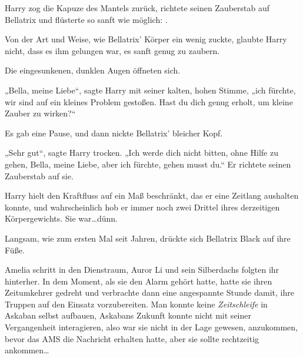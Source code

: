 Harry zog die Kapuze des Mantels zurück, richtete seinen Zauberstab auf Bellatrix und flüsterte so sanft wie möglich: .

Von der Art und Weise, wie Bellatrix’ Körper ein wenig zuckte, glaubte Harry nicht, dass es ihm gelungen war, es sanft genug zu zaubern.

Die eingesunkenen, dunklen Augen öffneten sich.

„Bella, meine Liebe“, sagte Harry mit seiner kalten, hohen Stimme, „ich fürchte, wir sind auf ein kleines Problem gestoßen. Hast du dich genug erholt, um kleine Zauber zu wirken?“

Es gab eine Pause, und dann nickte Bellatrix’ bleicher Kopf.

„Sehr gut“, sagte Harry trocken.
„Ich werde dich nicht bitten, ohne Hilfe zu gehen, Bella, meine Liebe, aber ich fürchte, gehen musst du.“ Er richtete seinen Zauberstab auf sie. 

Harry hielt den Kraftfluss auf ein Maß beschränkt, das er eine Zeitlang aushalten konnte, und wahrscheinlich hob er immer noch zwei Drittel ihres derzeitigen Körpergewichts. Sie war…dünn.

Langsam, wie zum ersten Mal seit Jahren, drückte sich Bellatrix Black auf ihre Füße.

\later

Amelia schritt in den Dienstraum, Auror Li und sein Silberdachs folgten ihr hinterher. In dem Moment, als sie den Alarm gehört hatte, hatte sie ihren Zeitumkehrer gedreht und verbrachte dann eine angespannte Stunde damit, ihre Truppen auf den Einsatz vorzubereiten. Man konnte keine \emph{Zeitschleife} in Askaban selbst aufbauen, Askabans Zukunft konnte nicht mit seiner Vergangenheit interagieren, also war sie nicht in der Lage gewesen, anzukommen, bevor das AMS die Nachricht erhalten hatte, aber sie sollte rechtzeitig ankommen…

